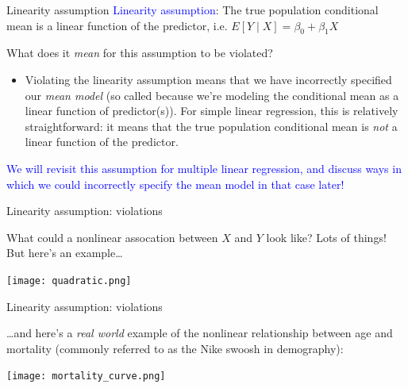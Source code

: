 \documentclass[10pt,t]{beamer}
\begin{document}
\begin{frame}{Linearity assumption}
\textcolor{blue}{Linearity assumption}: The true population conditional mean is a linear function of the predictor, i.e. $E[Y \mid X] = \beta_0 + \beta_1 X$

\vspace{0.3cm}

What does it \textit{mean} for this assumption to be violated?

\vspace{0.3cm}

\begin{itemize}
	\item[] Violating the linearity assumption means that we have incorrectly specified our \textit{mean model} (so called because we're modeling the conditional mean as a linear function of predictor(s)). For simple linear regression, this is relatively straightforward: it means that the true population conditional mean is \textit{not} a linear function of the predictor.
\end{itemize}

\vspace{0.3cm}

 \textcolor{blue}{We will revisit this assumption for multiple linear regression, and discuss ways in which we could incorrectly specify the mean model in that case later!}

\end{frame}

\begin{frame}{Linearity assumption: violations}

What could a nonlinear assocation between $X$ and $Y$ look like? Lots of things! But here's an example\dots

\vspace{0.3cm}

\centering \texttt{[image: quadratic.png]}

\end{frame}

\begin{frame}{Linearity assumption: violations}

\dots and here's a \textit{real world} example of the nonlinear relationship between age and mortality (commonly referred to as the Nike swoosh in demography):

\vspace{0.3cm}

\centering \texttt{[image: mortality\_curve.png]}

\end{frame}
\end{document}
